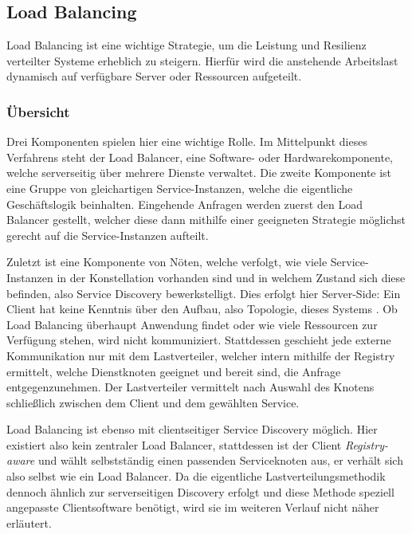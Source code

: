 \subsection{Load Balancing}
Load Balancing ist eine wichtige Strategie, um die Leistung und Resilienz verteilter Systeme erheblich zu steigern. Hierfür wird die anstehende Arbeitslast dynamisch auf verfügbare Server oder Ressourcen aufgeteilt.

\subsubsection{Übersicht}
Drei Komponenten spielen hier eine wichtige Rolle. Im Mittelpunkt dieses Verfahrens steht der Load Balancer, eine Software- oder Hardwarekomponente, welche serverseitig über mehrere Dienste verwaltet. Die zweite Komponente ist eine Gruppe von gleichartigen Service-Instanzen, welche die eigentliche Geschäftslogik beinhalten. Eingehende Anfragen werden zuerst den Load Balancer gestellt, welcher diese dann mithilfe einer geeigneten Strategie möglichst gerecht auf die Service-Instanzen aufteilt.

Zuletzt ist eine Komponente von Nöten, welche verfolgt, wie viele Service-Instanzen in der Konstellation vorhanden sind und in welchem Zustand sich diese befinden, also Service Discovery bewerkstelligt. Dies erfolgt hier Server-Side: Ein Client hat keine Kenntnis über den Aufbau, also Topologie, dieses Systems \cite{schoner2017analyse}. Ob Load Balancing überhaupt Anwendung findet oder wie viele Ressourcen zur Verfügung stehen, wird nicht kommuniziert. Stattdessen geschieht jede externe Kommunikation nur mit dem Lastverteiler, welcher intern mithilfe der Registry ermittelt, welche Dienstknoten geeignet und bereit sind, die Anfrage entgegenzunehmen. Der Lastverteiler vermittelt nach Auswahl des Knotens schließlich zwischen dem Client und dem gewählten Service.

Load Balancing ist ebenso mit clientseitiger Service Discovery möglich. Hier existiert also kein zentraler Load Balancer, stattdessen ist der Client \textit{Registry-aware} \cite{schoner2017analyse} und wählt selbstständig einen passenden Serviceknoten aus, er verhält sich also selbst wie ein Load Balancer. Da die eigentliche Lastverteilungsmethodik dennoch ähnlich zur serverseitigen Discovery erfolgt und diese Methode speziell angepasste Clientsoftware benötigt, wird sie im weiteren Verlauf nicht näher erläutert.

